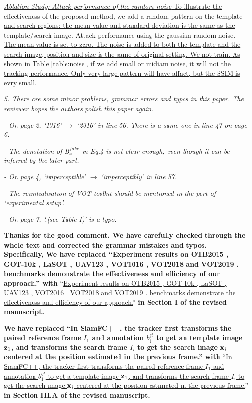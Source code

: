 \documentclass[12pt]{article}
\begin{document}
\uline{\textit{Ablation Study: Attack performance of the random noise} To illustrate the effectiveness of the proposed method, we add a random pattern on the template and search regions: the mean value and standard deviation is the same as the template/search image. Attack performance using the gaussian random noise. The mean value is set to zero. The noise is added to both the template and the search image, position and size is the same of original setting. We not train.
As shown in Table \ref{table:noise}, if we add small or midiam noise, it will not the tracking performance. Only very large pattern will have affact, but the SSIM is evry small.
}

\textit{
5. There are some minor problems, grammar errors and typos in this paper. The reviewer hopes the authors polish this paper again.}

\textit{- On page 2, ‘1016’ $\rightarrow$ ‘2016’ in line 56. There is a same one in line 47 on page 6.}

\textit{- The denotation of $B_x^{fake}$ in Eq.4 is not clear enough, even though it can be inferred by the later part.}

\textit{- On page 4, ‘imperceptible’ $\rightarrow$ ‘imperceptibly’ in line 57.}

\textit{- The reinitialization of VOT-toolkit should be mentioned in the part of ‘experimental setup’.}

\textit{- On page 7, ‘.(see Table I)’ is a typo.}

\textbf{Thanks for the good comment. We have carefully checked through the whole text and corrected the grammar mistakes and typos. Specifically,}
\textbf{We have replaced ``Experiment results on OTB2015 \cite{OTB}, GOT-10k \cite{GOT-10k}, LaSOT \cite{GOT-10k}, UAV123 \cite{UAV123}, VOT1016 \cite{VOT2016}, VOT2018 \cite{VOT2018} and VOT2019 \cite{VOT2019}. benchmarks demonstrate the effectiveness and efficiency of our approach.'' with}
``\uline{Experiment results on OTB2015 \cite{OTB}, GOT-10k \cite{GOT-10k}, LaSOT \cite{LaSOT}, UAV123 \cite{UAV123}, VOT2016 \cite{VOT2016}, VOT2018 \cite{VOT2018} and VOT2019 \cite{VOT2019}. benchmarks demonstrate the effectiveness and efficiency of our approach.}''
\textbf{in Section I of the revised manuscript.}

\textbf{We have replaced ``In SiamFC++, the tracker first transforms the paired reference frame $I_1$ and annotation $b_1^{gt}$ to get an template image $\textbf z_1$, and transforms the search frame $I_i$ to get the search image $\textbf x_i$ centered at the position estimated in the previous frame.'' with}
``\uline{In SiamFC++, the tracker first transforms the paired reference frame $I_1$ and annotation $b_1^{gt}$ to get a template image $\textbf z_1$, and transforms the search frame $I_i$ to get the search image $\textbf x_i$ centered at the position estimated in the previous frame.}''
\textbf{in Section III.A of the revised manuscript.}
\end{document}
